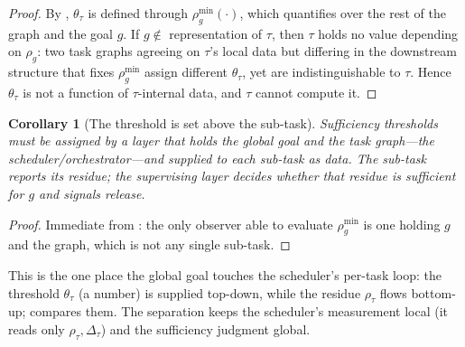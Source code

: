 \documentclass[twocolumn,10pt,a4paper]{article}
\theoremstyle{thmstyle}
\newtheorem{corollary}[theorem]{Corollary}
\theoremstyle{definition}
\theoremstyle{remark}
\newcommand{\res}{\rho}
\newcommand{\task}{\tau}
\begin{document}
\begin{proof}
By , $\theta_\task$ is defined through
$\res_g^{\min}(\cdot)$, which quantifies over the rest of the graph and
the goal $g$. If $g\notin$ representation of $\task$, then $\task$ holds
no value depending on $\res_g$: two task graphs agreeing on $\task$'s
local data but differing in the downstream structure that fixes
$\res_g^{\min}$ assign different $\theta_\task$, yet are indistinguishable
to $\task$. Hence $\theta_\task$ is not a function of $\task$-internal
data, and $\task$ cannot compute it.
\end{proof}

\begin{corollary}[The threshold is set above the sub-task]
\label{cor:above}
Sufficiency thresholds must be assigned by a layer that holds the global
goal and the task graph---the scheduler/orchestrator---and supplied to
each sub-task as data. The sub-task reports its residue; the supervising
layer decides whether that residue is sufficient for $g$ and signals
release.
\end{corollary}

\begin{proof}
Immediate from : the only observer able to evaluate
$\res_g^{\min}$ is one holding $g$ and the graph, which is not any single
sub-task.
\end{proof}

This is the one place the global goal touches the scheduler's per-task
loop: the threshold $\theta_\task$ (a number) is supplied top-down, while
the residue $\res_\task$ flows bottom-up;  compares them.
The separation keeps the scheduler's measurement local (it reads only
$\res_\task,\Delta_\task$) and the sufficiency judgment global.
\end{document}
